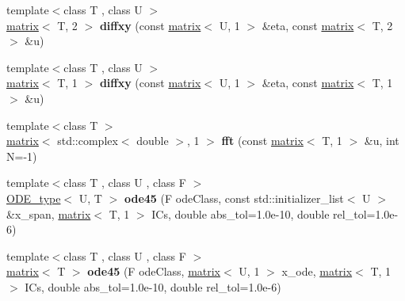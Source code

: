 \begin{DoxyCompactItemize}
\item 
\hypertarget{namespacekeycpp_a232fca3b7e079168f3588cbda16a4808}{{\footnotesize template$<$class T , class U $>$ }\\\hyperlink{classkeycpp_1_1matrix}{matrix}$<$ T, 2 $>$ {\bfseries diffxy} (const \hyperlink{classkeycpp_1_1matrix}{matrix}$<$ U, 1 $>$ \&eta, const \hyperlink{classkeycpp_1_1matrix}{matrix}$<$ T, 2 $>$ \&u)}\label{namespacekeycpp_a232fca3b7e079168f3588cbda16a4808}

\item 
\hypertarget{namespacekeycpp_a06cc6a57c0c427d6cf8800969003af7c}{{\footnotesize template$<$class T , class U $>$ }\\\hyperlink{classkeycpp_1_1matrix}{matrix}$<$ T, 1 $>$ {\bfseries diffxy} (const \hyperlink{classkeycpp_1_1matrix}{matrix}$<$ U, 1 $>$ \&eta, const \hyperlink{classkeycpp_1_1matrix}{matrix}$<$ T, 1 $>$ \&u)}\label{namespacekeycpp_a06cc6a57c0c427d6cf8800969003af7c}

\item 
\hypertarget{namespacekeycpp_a61efdf6ebae0ecb767132e59c2e60e3d}{{\footnotesize template$<$class T $>$ }\\\hyperlink{classkeycpp_1_1matrix}{matrix}$<$ std\-::complex$<$ double $>$, 1 $>$ {\bfseries fft} (const \hyperlink{classkeycpp_1_1matrix}{matrix}$<$ T, 1 $>$ \&u, int N=-\/1)}\label{namespacekeycpp_a61efdf6ebae0ecb767132e59c2e60e3d}

\item 
\hypertarget{namespacekeycpp_a34bd649bfb166d80da042fc50275c5b9}{{\footnotesize template$<$class T , class U , class F $>$ }\\\hyperlink{structkeycpp_1_1_o_d_e__type}{O\-D\-E\-\_\-type}$<$ U, T $>$ {\bfseries ode45} (F ode\-Class, const std\-::initializer\-\_\-list$<$ U $>$ \&x\-\_\-span, \hyperlink{classkeycpp_1_1matrix}{matrix}$<$ T, 1 $>$ I\-Cs, double abs\-\_\-tol=1.\-0e-\/10, double rel\-\_\-tol=1.\-0e-\/6)}\label{namespacekeycpp_a34bd649bfb166d80da042fc50275c5b9}

\item 
\hypertarget{namespacekeycpp_ace2dd255c17cb6d38d4242386c8dca83}{{\footnotesize template$<$class T , class U , class F $>$ }\\\hyperlink{classkeycpp_1_1matrix}{matrix}$<$ T $>$ {\bfseries ode45} (F ode\-Class, \hyperlink{classkeycpp_1_1matrix}{matrix}$<$ U, 1 $>$ x\-\_\-ode, \hyperlink{classkeycpp_1_1matrix}{matrix}$<$ T, 1 $>$ I\-Cs, double abs\-\_\-tol=1.\-0e-\/10, double rel\-\_\-tol=1.\-0e-\/6)}\label{namespacekeycpp_ace2dd255c17cb6d38d4242386c8dca83}


\end{DoxyCompactItemize}
